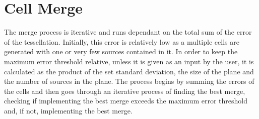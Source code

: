 \section{Cell Merge}
The merge process is iterative and runs dependant on the total sum of the error of the tessellation. Initially, this error is relatively low as a multiple cells are generated with one or very few sources contained in it. In order to keep the maximum error threshold relative, unless it is given as an input by the user, it is calculated as the product of the set standard deviation, the size of the plane and the number of sources in the plane. The process begins by summing the errors of the cells and then goes through an iterative process of finding the best merge, checking if implementing the best merge exceeds the maximum error threshold and, if not, implementing the best merge.

